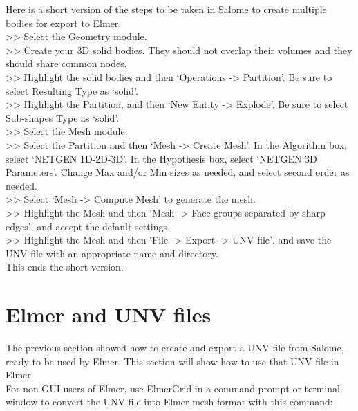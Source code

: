 \noindent Here is a short version of the steps to be taken in Salome to create multiple bodies for export to Elmer.\\

>> Select the Geometry module.\\

>> Create your 3D solid bodies.  They should not overlap their volumes and they should share common nodes.\\

>> Highlight the solid bodies and then `Operations -> Partition'.  Be sure to select Resulting Type as `solid'.\\

>> Highlight the Partition, and then `New Entity -> Explode'.  Be sure to select Sub-shapes Type as `solid'.\\

>> Select the Mesh module.\\

>> Select the Partition and then `Mesh -> Create Mesh'.  In the Algorithm box, select `NETGEN 1D-2D-3D'.  In the Hypothesis box, select `NETGEN 3D Parameters'.  Change Max and/or Min sizes as needed, and select second order as needed.\\

>> Select `Mesh -> Compute Mesh' to generate the mesh.\\

>> Highlight the Mesh and then `Mesh -> Face groups separated by sharp edges', and accept the default settings.\\

>> Highlight the Mesh and then `File -> Export -> UNV file', and save the UNV file with an appropriate name and directory.\\

\noindent This ends the short version.


\newpage

\section{Elmer and UNV files}

The previous section showed how to create and export a UNV file from Salome, ready to be used by Elmer.  This section will show how to use that UNV file in Elmer.\\

For non-GUI users of Elmer, use ElmerGrid in a command prompt or terminal window to convert the UNV file into Elmer mesh format with this command:\\

